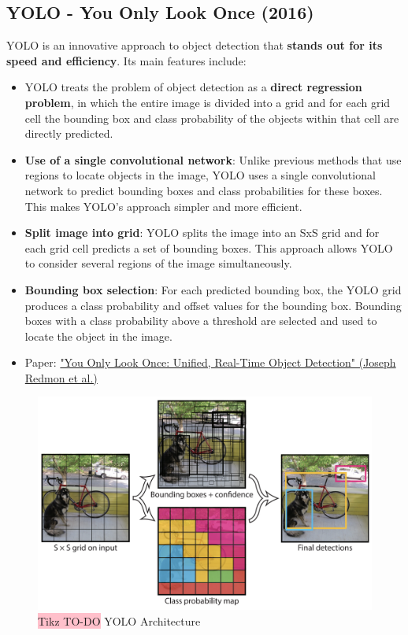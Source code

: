 \subsection{YOLO - You Only Look Once (2016)}
YOLO is an innovative approach to object detection that \textbf{stands out for its speed and efficiency}. Its main features include:

\begin{itemize}
    \item YOLO treats the problem of object detection as a \textbf{direct regression problem}, in which the entire image is divided into a grid and for each grid cell the bounding box and class probability of the objects within that cell are directly predicted.
    \item \textbf{Use of a single convolutional network}: Unlike previous methods that use regions to locate objects in the image, YOLO uses a single convolutional network to predict bounding boxes and class probabilities for these boxes. This makes YOLO's approach simpler and more efficient.
    \item \textbf{Split image into grid}: YOLO splits the image into an SxS grid and for each grid cell predicts a set of bounding boxes. This approach allows YOLO to consider several regions of the image simultaneously.
    \item \textbf{Bounding box selection}: For each predicted bounding box, the YOLO grid produces a class probability and offset values for the bounding box. Bounding boxes with a class probability above a threshold are selected and used to locate the object in the image.
    \item Paper: \href{https://arxiv.org/pdf/1506.02640.pdf}{"You Only Look Once: Unified, Real-Time Object Detection" (Joseph Redmon et al.)}
\end{itemize}

\begin{figure}[!htbp]
    \centering
    \includegraphics[width=\textwidth]{tikz/chapter5 - YOLO.png}
    \caption{{\color{red}\colorbox{pink}{Tikz TO-DO}} YOLO Architecture}
\end{figure}


